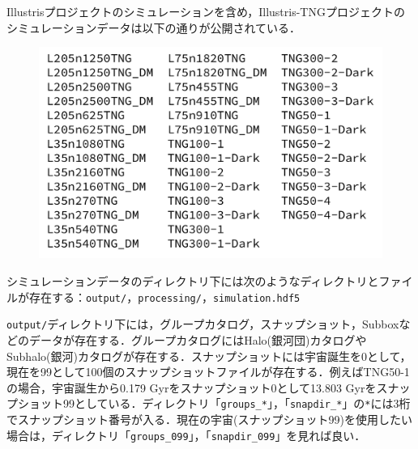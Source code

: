 %

Illustrisプロジェクトのシミュレーションを含め，Illustris-TNGプロジェクトのシミュレーションデータは以下の通りが公開されている．

\begin{figure}[H]
	\centering
	\includegraphics[width=0.7\linewidth]{./pic/ALLsimTNG.pdf}
\end{figure}

シミュレーションデータのディレクトリ下には次のようなディレクトリとファイルが存在する：\texttt{output/}，\texttt{processing/}，\texttt{simulation.hdf5}

\texttt{output/}ディレクトリ下には，グループカタログ，スナップショット，Subboxなどのデータが存在する．グループカタログにはHalo(銀河団)カタログやSubhalo(銀河)カタログが存在する．スナップショットには宇宙誕生を0として，現在を99として100個のスナップショットファイルが存在する．例えばTNG50-1の場合，宇宙誕生から0.179 Gyrをスナップショット0として13.803 Gyrをスナップショット99としている．ディレクトリ「\texttt{groups\_*}」，「\texttt{snapdir\_*}」の\texttt{*}には3桁でスナップショット番号が入る．現在の宇宙(スナップショット99)を使用したい場合は，ディレクトリ「\texttt{groups\_099}」，「\texttt{snapdir\_099}」を見れば良い．

